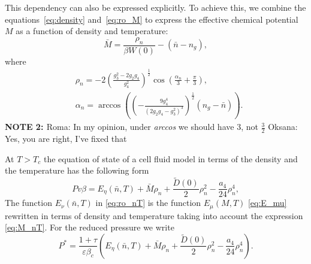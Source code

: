 \documentclass[12pt]{article}
\begin{document}
	This dependency can also be expressed explicitly. To achieve this, we combine the equations~\eqref{eq:density} and~\eqref{eq:ro_M} to express the effective chemical potential $M$ as a function of density and temperature:
	\begin{equation}\label{eq:M_nT}
		\bar M = \frac{\rho_{n}}{\beta W(0)} - (\bar n - n_g),
	\end{equation}
	where
	\begin{align} \label{eq:ro_nT}
		 & \rho_{n} = - 2 \left(\frac{g_3^2 - 2g_2 g_4}{g_4^2} \right)^{\frac{1}{2}} \cos \left( \frac{\alpha_n}{3} + \frac{\pi}{3} \right), \\
		 & \alpha_n = \arccos \left( \left( - \frac{9 g_4^4}{\left( 2 g_2 g_4 - g_3^2\right)^3}\right)^{\frac{1}{2}} (n_g - \bar n)\right). \nonumber 
	\end{align}
	{\color{Red} {\bf{NOTE 2: }} Roma: In my opinion, under {\it{arccos}} we should have 3, not $\frac{3}{2}$ \color{Green} Oksana: Yes, you are right, I've fixed that }
	
	At $T>T_c$ the equation of state of a cell fluid model in terms of the density and the temperature has the following form
	\begin{equation}\label{eq:eosNT}
	Pv\beta = E_\eta (\bar n,T) + \bar M \rho_{n} + \frac{\tilde D(0)}{2} \rho_{n}^2 - \frac{a_4}{24} \rho_{n}^4,
	\end{equation}
 The function $E_\nu (\bar n, T)$ in \eqref{eq:ro_nT} is the function $E_\mu (M,T)$ \eqref{eq:E_mu} rewritten in terms of density and temperature taking into account the expression \eqref{eq:M_nT}. For the reduced pressure we write
 \begin{equation}
 	\label{eq:eosPTn_reduced}
 	P^* = \frac{1 + \tau}{\varepsilon \beta_c} \left(E_\eta (\bar n,T) + \bar M \rho_{n} + \frac{\tilde D(0)}{2} \rho_{n}^2 - \frac{a_4}{24} \rho_{n}^4\right).
 \end{equation}
	
\end{document}
